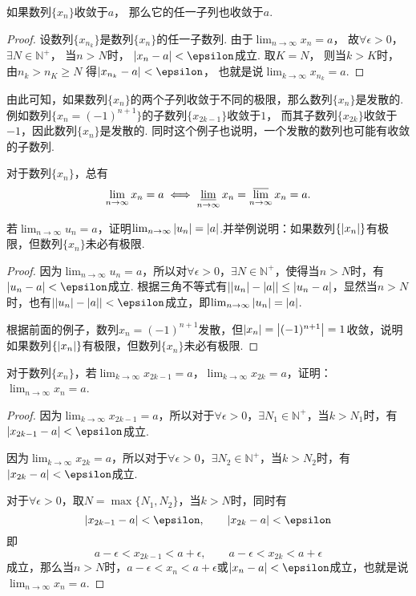 \begin{theorem}[收敛数列与其子列的关系]\label{theorem:子列极限.数列收敛的充分必要条件}
如果数列\(\{x_n\}\)收敛于\(a\)，
那么它的任一子列也收敛于\(a\).
\begin{proof}
设数列\(\{x_{n_k}\}\)是数列\(\{x_n\}\)的任一子数列.
由于\(\lim_{n\to\infty}x_n = a\)，
故\(\forall \epsilon > 0\)，
\(\exists N \in \mathbb{N}^+\)，
当\(n > N\)时，
\(\abs{x_n - a} < \epsilon\)成立.
取\(K = N\)，
则当\(k > K\)时，
由\(n_k > n_K \geq N\)
得\(\abs{x_{n_k} - a} < \epsilon\)，
也就是说\(\lim_{k\to\infty}x_{n_k} = a\).
\end{proof}
\end{theorem}
由此可知，如果数列\(\{x_n\}\)的两个子列收敛于不同的极限，那么数列\(\{x_n\}\)是发散的.
例如数列\(\{x_n=(-1)^{n+1}\}\)的子数列\(\{x_{2k-1}\}\)收敛于\(1\)，
而其子数列\(\{x_{2k}\}\)收敛于\(-1\)，因此数列\(\{x_n\}\)是发散的.
同时这个例子也说明，一个发散的数列也可能有收敛的子数列.

\begin{corollary}
对于数列\(\{x_n\}\)，总有\[
	\lim_{n\to\infty} x_n = a
	\iff
	\varliminf_{n\to\infty} x_n
	= \varlimsup_{n\to\infty} x_n
	= a.
\]
\end{corollary}

\begin{example}
\def\l{\lim_{n\to\infty}}
若\(\l u_n = a\)，证明\(\l \abs{u_n} = \abs{a}\).并举例说明：如果数列\(\{\abs{x_n}\}\)有极限，但数列\(\{x_n\}\)未必有极限.
\begin{proof}
因为\(\l u_n = a\)，所以对\(\forall\epsilon>0\)，\(\exists N \in \mathbb{N}^+\)，使得当\(n>N\)时，有\(\abs{u_n-a}<\epsilon\)成立.
根据三角不等式有\(\abs{\abs{u_n}-\abs{a}} \leq \abs{u_n-a}\)，显然当\(n>N\)时，也有\(\abs{\abs{u_n}-\abs{a}}<\epsilon\)成立，即\(\l \abs{u_n} = \abs{a}\).

根据前面的例子，数列\(x_n = (-1)^{n+1}\)发散，但\(\abs{x_n} = \abs{(-1)^{n+1}} = 1\)收敛，说明如果数列\(\{\abs{x_n}\}\)有极限，但数列\(\{x_n\}\)未必有极限.
\end{proof}
\end{example}

\begin{example}
\def\l#1{\lim_{#1\to\infty}}
对于数列\(\{x_n\}\)，若\(\l{k}x_{2k-1}=a\)，\(\l{k}x_{2k}=a\)，证明：\(\l{n}x_n=a\).
\begin{proof}
因为\(\l{k}x_{2k-1}=a\)，所以对于\(\forall\epsilon>0\)，\(\exists N_1 \in \mathbb{N}^+\)，当\(k>N_1\)时，有\(\abs{x_{2k-1}-a}<\epsilon\)成立.

因为\(\l{k}x_{2k}=a\)，所以对于\(\forall\epsilon>0\)，\(\exists N_2 \in \mathbb{N}^+\)，当\(k>N_2\)时，有\(\abs{x_{2k}-a}<\epsilon\)成立.

对于\(\forall\epsilon>0\)，取\(N = \max\{N_1,N_2\}\)，当\(k>N\)时，同时有\[
\abs{x_{2k-1}-a}<\epsilon, \qquad \abs{x_{2k}-a}<\epsilon
\]即\[
a-\epsilon<x_{2k-1}<a+\epsilon, \qquad a-\epsilon<x_{2k}<a+\epsilon
\]成立，那么当\(n>N\)时，\(a-\epsilon<x_n<a+\epsilon\)或\(\abs{x_n-a}<\epsilon\)成立，也就是说\(\l{n}x_n=a\).
\end{proof}
\end{example}

